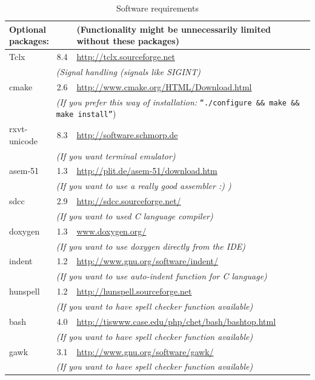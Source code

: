 \documentclass[a4paper,twoside,12pt]{book}
\begin{document}
\begin{table}[h]
\begin{tabular}{|l|c|l|}
				\multicolumn{2}{|l}{\textbf{Optional packages:}}
					& (Functionality might be unnecessarily limited without these packages) 		\\\hline
				Tclx		& 8.4		& \url{http://tclx.sourceforge.net}				\\
					& \multicolumn{2}{l|}{\textit{(Signal handling (signals like SIGINT)}}			\\\hline
				cmake		& 2.6		& \url{http://www.cmake.org/HTML/Download.html}			\\
					& \multicolumn{2}{l|}{
							\textit{(If you prefer this way of installation:}
							\texttt{``./configure \&\& make \&\& make install''})
						}										\\\hline
				rxvt-unicode	& 8.3		& \url{http://software.schmorp.de}				\\\hline
					& \multicolumn{2}{l|}{\textit{(If you want terminal emulator)}}				\\\hline
				asem-51		& 1.3		& \url{http://plit.de/asem-51/download.htm}			\\\hline
					& \multicolumn{2}{l|}{\textit{(If you want to use a really good assembler :) )}}	\\\hline
				sdcc		& 2.9		& \url{http://sdcc.sourceforge.net/}				\\\hline
					& \multicolumn{2}{l|}{\textit{(If you want to used C language compiler)}}		\\\hline
				doxygen		& 1.3		& \url{www.doxygen.org/}					\\\hline
					& \multicolumn{2}{l|}{\textit{(If you want to use doxygen directly from the IDE)}}	\\\hline
				indent		& 1.2		& \url{http://www.gnu.org/software/indent/}			\\\hline
					& \multicolumn{2}{l|}{\textit{(If you want to use auto-indent function for C language)}}\\\hline
				hunspell	& 1.2		& \url{http://hunspell.sourceforge.net}				\\\hline
					& \multicolumn{2}{l|}{\textit{(If you want to have spell checker function available)}}	\\\hline
				bash		& 4.0		& \url{http://tiswww.case.edu/php/chet/bash/bashtop.html}	\\\hline
					& \multicolumn{2}{l|}{\textit{(If you want to have spell checker function available)}}	\\\hline
				gawk		& 3.1		& \url{http://www.gnu.org/software/gawk/}			\\\hline
					& \multicolumn{2}{l|}{\textit{(If you want to have spell checker function available)}}	\\\hline
			\end{tabular}
			\caption{Software requirements}
		\end{table}
\end{document}
